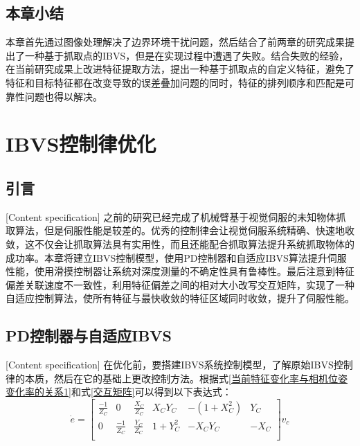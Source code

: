 \documentclass[fontset=fandol,type=bachelor,campus=harbin,bsmainpagenumberline=true]{hithesisbook}
\begin{document}
\section{本章小结}
本章首先通过图像处理解决了边界环境干扰问题，然后结合了前两章的研究成果提出了一种基于抓取点的IBVS，但是在实现过程中遭遇了失败。结合失败的经验，在当前研究成果上改进特征提取方法，提出一种基于抓取点的自定义特征，避免了特征和目标特征都在改变导致的误差叠加问题的同时，特征的排列顺序和匹配是可靠性问题也得以解决。



\chapter[IBVS控制律优化]{IBVS控制律优化}
\section{引言}[Content specification]
之前的研究已经完成了机械臂基于视觉伺服的未知物体抓取算法，但是伺服性能是较差的。优秀的控制律会让视觉伺服系统精确、快速地收敛，这不仅会让抓取算法具有实用性，而且还能配合抓取算法提升系统抓取物体的成功率。本章将建立IBVS控制模型，使用PD控制器和自适应IBVS算法\cite{mansard2007task}提升伺服性能，使用滑摸控制器让系统对深度测量的不确定性具有鲁棒性。最后注意到特征偏差关联速度不一致性，利用特征偏差之间的相对大小改写交互矩阵，实现了一种自适应控制算法，使所有特征与最快收敛的特征区域同时收敛，提升了伺服性能。


\section{PD控制器与自适应IBVS}[Content specification]
在优化前，要搭建IBVS系统控制模型，了解原始IBVS控制律的本质，然后在它的基础上更改控制方法。根据式\ref{当前特征变化率与相机位姿变化率的关系1}和式\ref{交互矩阵}可以得到以下表达式：
\begin{equation}
\dot{e}=\left[ \begin{matrix}
	\frac{-1}{Z_C}&		0&		\frac{X_C}{Z_C}&		X_CY_C&		-\left( 1+X_{C}^{2} \right)&		Y_C\\
	0&		\frac{-1}{Z_C}&		\frac{Y_C}{Z_C}&		1+Y_{C}^{2}&		-X_CY_C&		-X_C\\
\end{matrix} \right] v_c
\label{IBVS展开式}
\end{equation}
\end{document}
